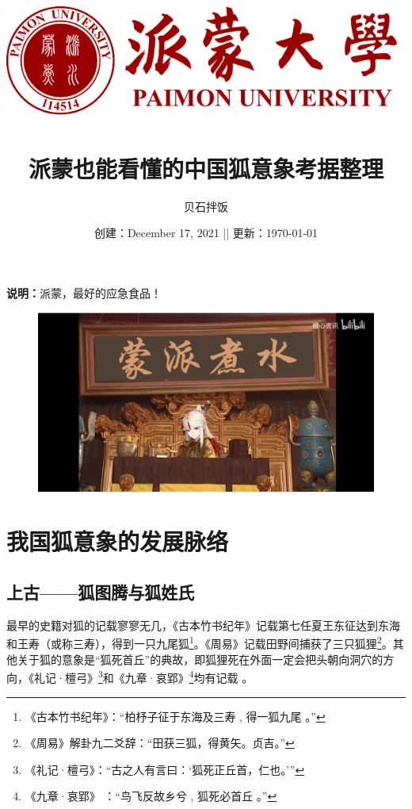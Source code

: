\documentclass[UTF8, 12pt, A4paper]{article}
\title{
    \includegraphics[scale=1]{PMU-logo.pdf} \\ %
    ~\\
    派蒙也能看懂的中国狐意象考据整理
    }
\author{贝石拌饭\footnotemark[1] \footnotemark[2]}
\date{创建：December 17, 2021 || 更新：\today}
\begin{document}
\maketitle
{} %
\thispagestyle{empty} %

\textbf{说明：}派蒙，最好的应急食品！


\begin{figure}[ht]
    \centering
    \includegraphics[width=15cm]{蒙派煮水.png}
\end{figure}


\newpage
\setcounter{page}{1} %
\tableofcontents

\newpage
\setcounter{page}{1}

\newpage
\section{我国狐意象的发展脉络}

\subsection{上古——狐图腾与狐姓氏}

最早的史籍对狐的记载寥寥无几，《古本竹书纪年》记载第七任夏王东征达到东海和王寿（或称三寿），得到一只九尾狐\footnote{《古本竹书纪年》：“柏杼子征于东海及三寿 , 得一狐九尾 。”}。《周易》记载田野间捕获了三只狐狸\footnote{《周易》解卦九二爻辞：“田获三狐，得黄矢。贞吉。”}。其他关于狐的意象是“狐死首丘”的典故，即狐狸死在外面一定会把头朝向洞穴的方向，《礼记·檀弓》\footnote{《礼记·檀弓》：“古之人有言曰：‘狐死正丘首，仁也。’”}和《九章·哀郢》\footnote{《九章·哀郢》 ：“鸟飞反故乡兮 , 狐死必首丘 。”}均有记载 。
\end{document}
